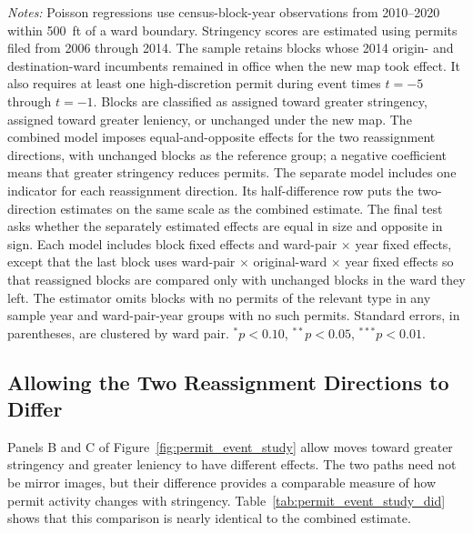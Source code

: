 \begin{table}[htbp]
    \centering
    \caption{Permit Effects with Combined and Separate Reassignment Directions}
    \label{tab:permit_event_study_did}
    

    \footnotesize
    \textit{Notes:} Poisson regressions use census-block-year observations from 2010--2020 within 500~ft of a ward boundary.
    Stringency scores are estimated using permits filed from 2006 through 2014.
    The sample retains blocks whose 2014 origin- and destination-ward incumbents remained in office when the new map took effect.
    It also requires at least one high-discretion permit during event times $t=-5$ through $t=-1$.
    Blocks are classified as assigned toward greater stringency, assigned toward greater leniency, or unchanged under the new map.
    The combined model imposes equal-and-opposite effects for the two reassignment directions, with unchanged blocks as the reference group; a negative coefficient means that greater stringency reduces permits.
    The separate model includes one indicator for each reassignment direction.
    Its half-difference row puts the two-direction estimates on the same scale as the combined estimate.
    The final test asks whether the separately estimated effects are equal in size and opposite in sign.
    Each model includes block fixed effects and ward-pair $\times$ year fixed effects, except that the last block uses ward-pair $\times$ original-ward $\times$ year fixed effects so that reassigned blocks are compared only with unchanged blocks in the ward they left.
    The estimator omits blocks with no permits of the relevant type in any sample year and ward-pair-year groups with no such permits.
    Standard errors, in parentheses, are clustered by ward pair.
    $^{*}p<0.10$, $^{**}p<0.05$, $^{***}p<0.01$.
\end{table}

\subsection{Allowing the Two Reassignment Directions to Differ}
\label{sec:appendix_permit_unconstrained}

Panels B and C of Figure~\ref{fig:permit_event_study} allow moves toward greater stringency and greater leniency to have different effects.
The two paths need not be mirror images, but their difference provides a comparable measure of how permit activity changes with stringency.
Table~\ref{tab:permit_event_study_did} shows that this comparison is nearly identical to the combined estimate.

